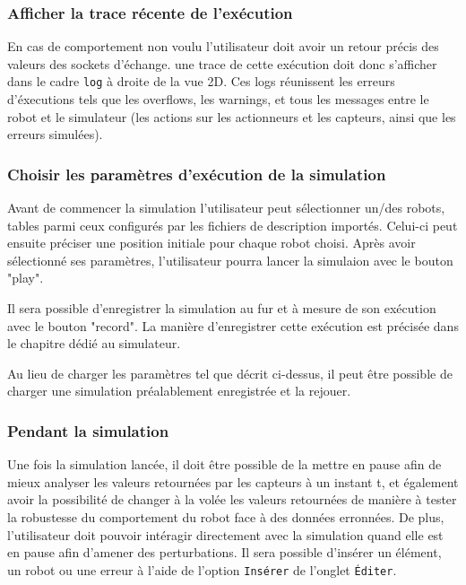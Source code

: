 \subsubsection{Afficher la trace récente de l'exécution}
En cas de comportement non voulu l'utilisateur doit avoir un retour précis des valeurs des sockets d'échange. une trace de cette exécution doit donc s'afficher dans le cadre \texttt{log} à droite de la vue 2D. Ces logs réunissent les erreurs d'éxecutions tels que les overflows, les warnings, et tous les messages entre le robot et le simulateur (les actions sur les actionneurs et les capteurs, ainsi que les erreurs simulées).

\subsubsection{Choisir les paramètres d'exécution de la simulation}
Avant de commencer la simulation l'utilisateur peut sélectionner un/des robots, tables parmi ceux configurés par les fichiers de description importés.
Celui-ci peut ensuite préciser une position initiale pour chaque robot choisi.
Après avoir sélectionné ses paramètres, l'utilisateur pourra lancer la simulaion avec le bouton "play".

Il sera possible d'enregistrer la simulation au fur et à mesure de son exécution avec le bouton "record". La manière d'enregistrer cette exécution est précisée dans le chapitre dédié au simulateur.

Au lieu de charger les paramètres tel que décrit ci-dessus, il peut être possible de charger une simulation préalablement enregistrée et la rejouer.


\subsubsection{Pendant la simulation}
Une fois la simulation lancée, il doit être possible de la mettre en pause afin de mieux analyser les valeurs retournées par les capteurs à un instant t, et également avoir la possibilité de changer à la volée les valeurs retournées de manière à tester la robustesse du comportement du robot face à des données erronnées.
De plus, l'utilisateur doit pouvoir intéragir directement avec la simulation quand elle est en pause afin d'amener des perturbations. Il sera possible d'insérer un élément, un robot ou une erreur à l'aide de l'option \texttt{Insérer} de l'onglet \texttt{\'Editer}.







